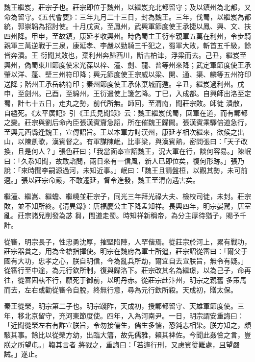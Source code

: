 \begin{pinyinscope}
 魏王繼岌，莊宗子也。莊宗即位于魏州，以繼岌充北都留守；及以鎮州為北都，又命為留守。《五代會要》：三年九月二十三日，封為魏王。三年，伐蜀，以繼岌為都統，郭崇韜為招討使。十月戊寅，至鳳州，武興軍節度使王承捷以鳳、興、文、扶四州降。甲申，至故鎮，康延孝收興州。時偽蜀主王衍率親軍五萬在利州，令步騎親軍三萬逆戰于三泉，康延孝、李嚴以勁騎三千犯之，蜀軍大敗，斬首五千級，餘皆奔潰。王
 衍聞其敗也，棄利州奔歸西川，斷吉柏津，浮梁而去。己丑，繼岌至興州，偽蜀東川節度使宋光葆以梓、潼、劍、龍、普等州來降；武定軍節度使王承肇以洋、蓬、壁三州符印降；興元節度使王宗威以梁、開、通、渠、麟等五州符印送降；階州王承岳納符印；秦州節度使王承休棄城而遁。辛丑，繼岌過利州。戊申，至劍州。己酉，至綿州，王衍遣使上箋乞降。丁巳，入成都。自興師出洛至定蜀，計七十五日，走丸之勢，前代所無。師回，至渭南，聞莊宗敗。師徒
 潰散，自縊死。《太平廣記》引《王氏見聞錄》云：魏王繼岌伐蜀，回軍在道，而有鄴都之變。莊宗與劉后命內臣張漢賓齎急詔，所在催魏王歸闕。張漢賓乘驛倍道急行，至興元西縣逢魏王，宣傳詔旨。王以本軍方討漢州，康延孝相次繼來，欲候之出山，以陳凱歌，漢賓督之。有軍謀陳岷，比事梁，與漢賓熟，密問張曰：「天子改換，且是何人？」張色莊曰；「我當面奉宣詔魏王，況大軍在行，談何容易。」陳岷曰：「久忝知聞，故敢諮問，兩日來有一信風，新人已即位矣，復何形跡。」張乃說：「來時聞李嗣源過河，未知近事。」岷曰：「魏王且請盤桓，以觀其勢，未可前邁。」張以莊宗命嚴，不敢遷延，督令進發，魏王至渭南遇害矣。



 繼潼、繼嵩、繼蟾、繼嶢並莊宗子，同光三年拜光祿大夫、檢校司徒，未封。莊宗敗，並不知所終。《清異錄》：唐福慶公主下降孟知祥。長興四年，明宗晏駕，唐室亂。莊宗諸兒削發為苾
 芻，間道走蜀。時知祥新稱帝，為分主厚待猶子，賜予千計。



 從審，明宗長子，性忠勇沈厚，摧堅陷陣，人罕偕焉。從莊宗於河上，累有戰功，莊宗器賞之，用為金槍指揮使。明宗在魏府為軍士所逼，莊宗詔從審曰：「爾父于國有大功，忠孝之心，朕自明信，今為亂兵所劫，爾宜自去宣朕旨，無令有疑。」從審行至中途，為元行欽所制，復與歸洛下。莊宗改其名為繼璟，以為己子，命再往，從審固執不行，願死于御前，以明丹赤。從莊宗赴汴州，明宗之親舊
 多策馬而去，左右或勸從審令自脫，終無行意，尋為元行欽所殺。天成初，贈太保。



 秦王從榮，明宗第二子也。明宗踐阼，天成初，授鄴都留守、天雄軍節度使。三年，移北京留守，充河東節度使。四年，入為河南尹。一日，明宗謂安重誨曰：「近聞從榮左右有詐宣朕旨，令勿接儒生，儒生多懦，恐鈍志相染。朕方知之，頗駭其事。餘比以從榮方幼，出臨大籓，故先儒雅，賴其裨佐。今聞此姦憸之言，豈朕之所望屯。」鞫其言者
 將戮之，重誨曰：「若遽行刑，又慮賓從難處，且望嚴誡。」遂止。




\end{pinyinscope}
